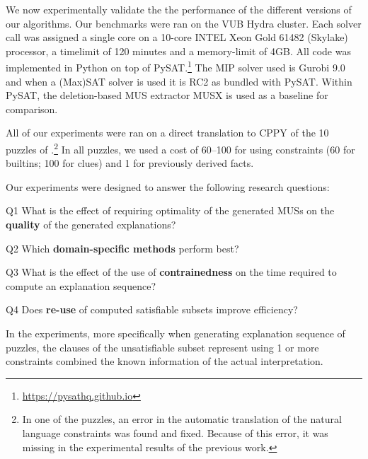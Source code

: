
We now experimentally validate the the performance of the different versions of our algorithms.
Our benchmarks were ran on the VUB Hydra cluster. Each solver call was assigned a single core on a 10-core INTEL Xeon Gold 61482 (Skylake) processor, a timelimit of 120 minutes and a memory-limit of 4GB.
 All code was implemented in Python on top of %
PySAT.\footnote{\url{https://pysathq.github.io}} The MIP solver used is Gurobi 9.0 and when a (Max)SAT solver is used it is RC2 as bundled with PySAT. Within PySAT, the deletion-based MUS extractor MUSX is used as a baseline for comparison.


All of our experiments were ran on a direct translation to CPPY of the 10 puzzles of \citet{ecai/BogaertsGCG20}.\footnote{In one of the puzzles, an error in the automatic translation of the natural language constraints was found and fixed. Because of this error, it was missing in the experimental results of the previous work.} 
In all puzzles, we used a cost of 60--100 for using constraints (60 for builtins; 100 for clues) and 1 for previously derived facts.

Our experiments were designed to answer the following research questions: 
\begin{compactdesc}
 \item[Q1] What is the effect of requiring optimality of the generated MUSs on the \textbf{quality} of the generated explanations?
 \item[Q2] Which \textbf{domain-specific \grow methods} perform best?
 \item[Q3] What is the effect of the use of \textbf{contrainedness} on the time required to compute an explanation sequence?
 \item[Q4] Does \textbf{re-use} of computed satisfiable subsets improve efficiency?
\end{compactdesc}
In the experiments, more specifically when generating explanation sequence of puzzles, the clauses of the unsatisfiable subset represent using 1 or more constraints combined the known information of the actual interpretation. 


